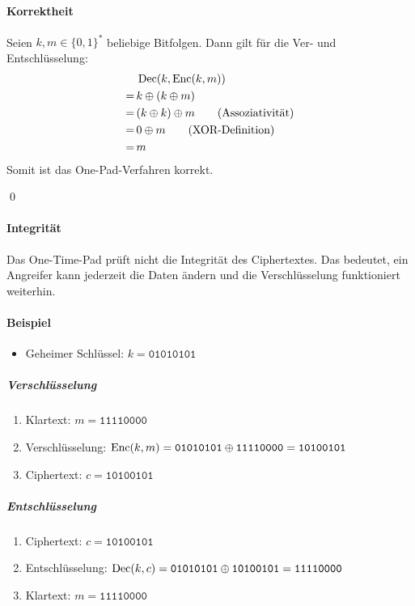                 \paragraph{Korrektheit}
                    Seien \( k, m \in \{ 0, 1 \} ^ * \) beliebige Bitfolgen. Dann gilt für die Ver- und Entschlüsselung:
                    \begin{align*}
	                      &\, \operatorname{Dec}(k, \operatorname{Enc}(k, m)) \\
	                    = &\, k \oplus (k \oplus m) \\
	                    = &\, (k \oplus k) \oplus m \tag{Assoziativität} \\
	                    = &\, 0 \oplus m \tag{XOR-Definition} \\
	                    = &\, m
                    \end{align*}
                    Somit ist das One-Pad-Verfahren korrekt.
                    
                    \qed
                
                \paragraph{Integrität}
                    Das One-Time-Pad prüft nicht die Integrität des Ciphertextes. Das bedeutet, ein Angreifer kann jederzeit die Daten ändern und die Verschlüsselung funktioniert weiterhin.
                
				\paragraph{Beispiel}
					\begin{itemize}
						\item Geheimer Schlüssel: \( k = \texttt{01010101} \)
					\end{itemize}
					
					\subparagraph{Verschlüsselung}
						\begin{enumerate}
							\item[] Klartext: \( m = \texttt{11110000} \)
							\item Verschlüsselung: \( \operatorname{Enc}(k, m) = \texttt{01010101} \oplus \texttt{11110000} = \texttt{10100101} \)
							\item[] Ciphertext: \( c = \texttt{10100101} \)
						\end{enumerate}
					
					\subparagraph{Entschlüsselung}
						\begin{enumerate}
							\item[] Ciphertext: \( c = \texttt{10100101} \)
							\item Entschlüsselung: \( \operatorname{Dec}(k, c) = \texttt{01010101} \oplus \texttt{10100101} = \texttt{11110000} \)
							\item[] Klartext: \( m = \texttt{11110000} \)
						\end{enumerate}

